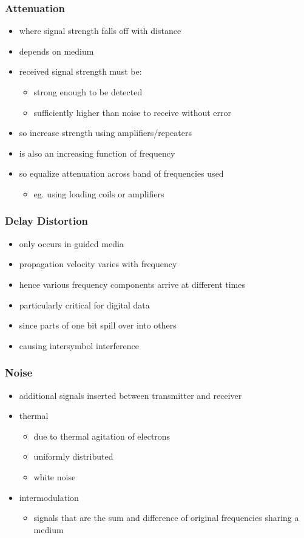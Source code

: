 \documentclass[pdflatex,compress]{beamer}
\begin{document}
\begin{frame}
	\frametitle{Attenuation}
	\begin{itemize}
		\item where signal strength falls off with distance
		\item depends on medium
		\item received signal strength must be:
		\begin{itemize}
			\item strong enough to be detected
			\item sufficiently higher than noise to receive without error
		\end{itemize}
		\item so increase strength using amplifiers/repeaters
		\item is also an increasing function of frequency
		\item so equalize attenuation across band of frequencies used
		\begin{itemize}
			\item eg. using loading coils or amplifiers
		\end{itemize}
	\end{itemize}
\end{frame}

\begin{frame}
	\frametitle{Delay Distortion}
	\begin{itemize}
		\item only occurs in guided media
		\item propagation velocity varies with frequency
		\item hence various frequency components arrive at different times
		\item particularly critical for digital data
		\item since parts of one bit spill over into others
		\item causing intersymbol interference
	\end{itemize}
\end{frame}

\begin{frame}
	\frametitle{Noise}
	\begin{itemize}
		\item additional signals inserted between transmitter and receiver
		\item thermal
		\begin{itemize}
			\item due to thermal agitation of electrons
			\item uniformly distributed
			\item white noise
		\end{itemize}
		\item intermodulation
		\begin{itemize}
			\item signals that are the sum and difference of original frequencies sharing a medium
		\end{itemize}
	\end{itemize}
\end{frame}
\end{document}
